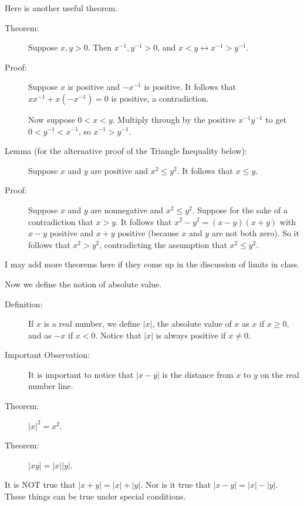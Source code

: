 \documentclass[12pt]{article}
\begin{document}
Here is another useful theorem.

\begin{description}

\item[Theorem:]  Suppose $x,y >0$.  Then $x^{-1}, y^{-1}>0$, and $x < y \leftrightarrow x^{-1}>y^{-1}$.

\item[Proof:]  Suppose $x$ is positive and $-x^{-1}$ is positive.  It follows that $xx^{-1} + x(-x^{-1}) = 0$ is positive, a contradiction.

Now suppose $0<x<y$.  Multiply through by the positive $x^{-1}y^{-1}$ to get $0<y^{-1}<x^{-1}$, so $x^{-1}>y^{-1}$.

\item[Lemma (for the alternative proof of the Triangle Inequality below):]  Suppose $x$ and $y$ are positive
and $x^2\leq y^2$.  It follows that $x \leq y$.

\item[Proof:]  Suppose $x$ and $y$ are nonnegative
and $x^2\leq y^2$.  Suppose for the sake of a contradiction that $x>y$.  It follows that $x^2 - y^2 = (x-y)(x+y)$ with $x-y$ positive and $x+y$ positive (because $x$ and $y$ are not both zero).  So it follows that $x^2>y^2$, contradicting the assumption that $x^2 \leq y^2$.

\end{description}

I may add more theorems here if they come up in the discussion of limits in class.

Now we define the notion of absolute value.

\begin{description}

\item[Definition:]  If $x$ is a real number, we define $|x|$, the absolute value of $x$ as $x$ if $x \geq 0$, and as $-x$ if $x<0$.  Notice that $|x|$ is always positive if $x \neq 0$.

\item[Important Observation:]  It is important to notice that $|x-y|$ is the distance from $x$ to $y$ on the real number line.

\item[Theorem:]  $|x|^2 = x^2$.

\item[Theorem:]  $|xy| = |x||y|$.

\end{description}

It is NOT true that $|x+y| = |x|+|y|$.  Nor is it true that $|x-y| = |x|-|y|$.  These things can be true under special conditions.
\end{document}

